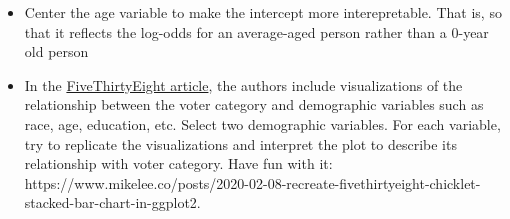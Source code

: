 \documentclass[
  letterpaper,
  DIV=11,
  numbers=noendperiod]{scrartcl}
\newenvironment{Shaded}{\begin{snugshade}}{\end{snugshade}}
\newcommand{\AttributeTok}[1]{\textcolor[rgb]{0.40,0.45,0.13}{#1}}
\newcommand{\ConstantTok}[1]{\textcolor[rgb]{0.56,0.35,0.01}{#1}}
\newcommand{\FunctionTok}[1]{\textcolor[rgb]{0.28,0.35,0.67}{#1}}
\newcommand{\NormalTok}[1]{\textcolor[rgb]{0.00,0.23,0.31}{#1}}
\newcommand{\OtherTok}[1]{\textcolor[rgb]{0.00,0.23,0.31}{#1}}
\newcommand{\SpecialCharTok}[1]{\textcolor[rgb]{0.37,0.37,0.37}{#1}}
\providecommand{\tightlist}{%
  \setlength{\itemsep}{0pt}\setlength{\parskip}{0pt}}\usepackage{longtable,booktabs,array}
\begin{document}
\begin{itemize}
\tightlist
\item
  Center the age variable to make the intercept more interepretable.
  That is, so that it reflects the log-odds for an average-aged person
  rather than a 0-year old person
\end{itemize}

\begin{Shaded}
\end{Shaded}

\begin{itemize}
\tightlist
\item
  In the
  \href{https://projects.fivethirtyeight.com/non-voters-poll-2020-election/}{FiveThirtyEight
  article}, the authors include visualizations of the relationship
  between the voter category and demographic variables such as race,
  age, education, etc. Select two demographic variables. For each
  variable, try to replicate the visualizations and interpret the plot
  to describe its relationship with voter category. Have fun with it:
  https://www.mikelee.co/posts/2020-02-08-recreate-fivethirtyeight-chicklet-stacked-bar-chart-in-ggplot2.
\end{itemize}
\end{document}
